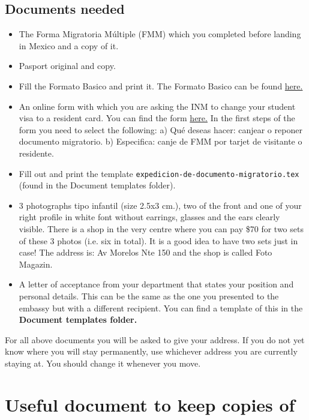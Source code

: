 \documentclass{article}
\begin{document}
\subsection{Documents needed}

\begin{itemize}
\item The Forma Migratoria Múltiple (FMM) which you completed before landing in Mexico and a copy of it. 
\item Pasport original and copy. 
\item Fill the Formato Basico and print it. The Formato Basico can be found \href{http://www.inm.gob.mx/complementos/FORMATO/Formato_Basico.pdf}{here.}
\item An online form with which you are asking the INM to change your student visa to a resident card. You can find the form \href{https://www.inm.gob.mx/tramites/publico/estancia.html}{here.} In the first steps of the form you need to select the following: 
 a) Qué deseas hacer: canjear o reponer documento migratorio. b) Especifica: canje de FMM por tarjet de visitante o residente.  
\item Fill out and print the template \texttt{expedicion-de-documento-migratorio.tex} (found in the Document templates folder).
\item 3 photographs tipo infantil (size 2.5x3 cm.), two of the front and one of your right profile in white font without earrings, glasses and the ears clearly visible. There is a shop in the very centre where you can pay \$70 for two sets of these 3 photos (i.e. six in total). It is a good idea to have two sets just in case! The address is: Av Morelos Nte 150 and the shop is called Foto Magazin.
\item A letter of acceptance from your department that states your position and personal details. This can be the same as the one you presented to the embassy but with a different recipient. You can find a template of this in the \textbf{Document templates folder.}
\end{itemize}

For all above documents you will be asked to give your address. If you do not yet know where you will stay permanently, use whichever address you are currently staying at.  You should change it whenever you move.

\section{Useful document to keep copies of}
\end{document}
